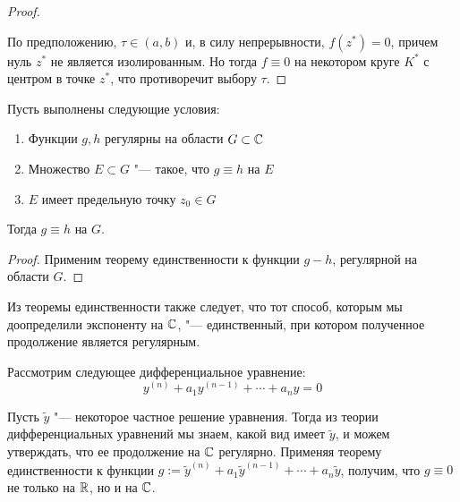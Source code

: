 \begin{proof}
\begin{center}
{
		}
	\end{center}
	
	По предположению, $\tau \in (a, b)$ и, в силу непрерывности, $f(z^*) = 0$, причем нуль $z^*$ не является изолированным. Но тогда $f \equiv 0$ на некотором круге $K^*$ с центром в точке $z^*$, что противоречит выбору $\tau$.
\end{proof}

\begin{corollary}
	Пусть выполнены следующие условия:
	\begin{enumerate}
		\item Функции $g, h$ регулярны на области $G \subset \mathbb{C}$
		\item Множество $E \subset G$ "--- такое, что $g \equiv h$ на $E$
		\item $E$ имеет предельную точку $z_0 \in G$
	\end{enumerate}
	
	Тогда $g \equiv h$ на $G$.
\end{corollary}

\begin{proof}
	Применим теорему единственности к функции $g - h$, регулярной на области $G$.
\end{proof}

\begin{note}
	Из теоремы единственности также следует, что тот способ, которым мы доопределили экспоненту на $\mathbb{C}$, "--- единственный, при котором полученное продолжение является регулярным.
\end{note}

\begin{example}
	Рассмотрим следующее дифференциальное уравнение:
	\[y^{(n)} + a_1y^{(n-1)} + \dotsb + a_ny = 0\]
	
	Пусть $\widetilde y$ "--- некоторое частное решение уравнения. Тогда из теории дифференциальных уравнений мы знаем, какой вид имеет $\widetilde y$, и можем утверждать, что ее продолжение на $\mathbb{C}$ регулярно. Применяя теорему единственности к функции $g := \widetilde y^{(n)} + a_1\widetilde y^{(n-1)} + \dotsb + a_n\widetilde y$, получим, что $g \equiv 0$ не только на $\mathbb{R}$, но и на $\mathbb{C}$.
\end{example}